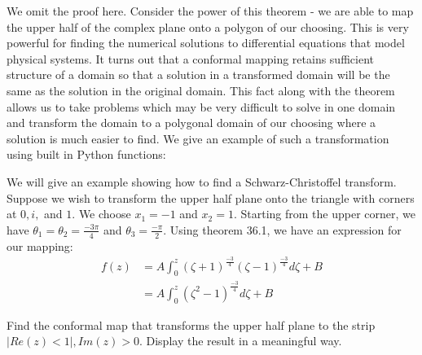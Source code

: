 We omit the proof here.  Consider the power of this theorem - we are able to map the upper half of the complex plane onto a polygon of our choosing.  This is very powerful for finding the numerical solutions to differential equations that model physical systems.  It turns out that a conformal mapping retains sufficient structure of a domain so that a solution in a transformed domain will be the same as the solution in the original domain.  This fact along with the theorem allows us to take problems which may be very difficult to solve in one domain and transform the domain to a polygonal domain of our choosing where a solution is much easier to find.  We give an example of such a transformation using built in Python functions:

\begin{example}
We will give an example showing how to find a Schwarz-Christoffel transform.  Suppose we wish to transform the upper half plane onto the triangle with corners at $0, i,$ and $1$.  We choose $x_1 = -1$ and $x_2 = 1$.  Starting from the upper corner, we have $\theta_1 = \theta_2 = \frac{-3\pi}{4}$ and $\theta_3 = \frac{-\pi}{2}$.  Using theorem 36.1, we have an expression for our mapping:
\begin{align*}
f(z) &= A\int_0^z(\zeta + 1)^{\frac{-3}{4}}(\zeta - 1)^{\frac{-3}{4}}d\zeta + B \\
	 &= A\int_0^z(\zeta^2 - 1)^{\frac{-3}{4}}d\zeta + B
\end{align*}

\end{example}

\begin{problem}
Find the conformal map that transforms the upper half plane to the strip $|Re(z) < 1|, Im(z) > 0$.  Display the result in a meaningful way.
\end{problem}
